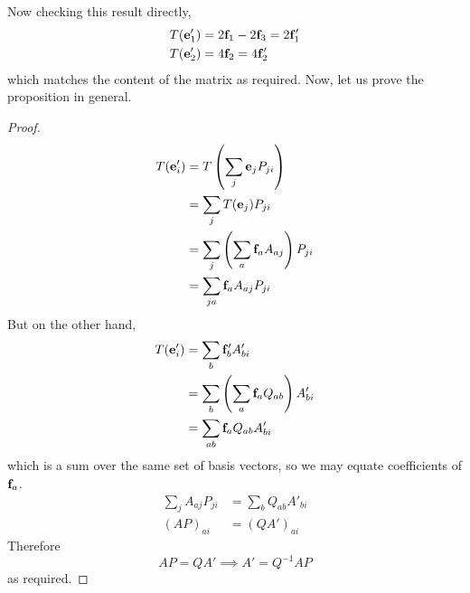 Now checking this result directly,
\begin{align*}
	T(\vb e'_1) & = 2\vb f_1 - 2\vb f_3 = 2\vb f_1' \\
	T(\vb e'_2) & = 4\vb f_2 = 4\vb f_2'
\end{align*}
which matches the content of the matrix as required.
Now, let us prove the proposition in general.
\begin{proof}
	\begin{align*}
		T(\vb e'_i) & = T\left( \sum_j \vb e_j P_{ji} \right)              \\
		            & = \sum_j T(\vb e_j) P_{ji}                           \\
		            & = \sum_j \left( \sum_a \vb f_a A_{aj} \right) P_{ji} \\
		            & = \sum_{ja} \vb f_a A_{aj} P_{ji}
	\end{align*}
	But on the other hand,
	\begin{align*}
		T(\vb e'_i) & = \sum_b \vb f'_b A'_{bi}                             \\
		            & = \sum_b \left( \sum_a \vb f_a Q_{ab} \right) A'_{bi} \\
		            & = \sum_{ab} \vb f_a Q_{ab} A'_{bi}
	\end{align*}
	which is a sum over the same set of basis vectors, so we may equate coefficients of \(\vb f_a\).
	\begin{align*}
		\sum_j A_{aj} P_{ji} & = \sum_b Q_{ab} A'_{bi} \\
		(AP)_{ai}            & = (QA')_{ai}
	\end{align*}
	Therefore
	\[
		AP = QA' \implies A' = Q^{-1}AP
	\]
	as required.
\end{proof}

